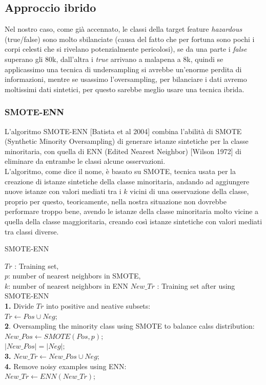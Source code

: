 \documentclass[italian,12pt,a4paper]{article}
\begin{document}
	\subsection{Approccio ibrido}
	Nel nostro caso, come già accennato, le classi della target feature \textit{hazardous} (true/false) sono molto sbilanciate (causa del fatto che per fortuna sono pochi i corpi celesti che si rivelano potenzialmente pericolosi), se da una parte i \textit{false} superano gli 80k, dall'altra i \textit{true} arrivano a malapena a 8k, quindi se applicassimo una tecnica di undersampling si avrebbe un’enorme perdita di informazioni, mentre se usassimo l’oversampling, per bilanciare i dati avremo moltissimi dati sintetici, per questo sarebbe meglio usare una tecnica ibrida.
	\linebreak
	\subsubsection{SMOTE-ENN}
	L’algoritmo SMOTE-ENN [Batista et al 2004] combina l’abilità di SMOTE (Synthetic Minority Oversampling)  di generare istanze sintetiche per la classe minoritaria, con quella di ENN (Edited Nearest Neighbor) [Wilson 1972] di eliminare da entrambe le classi alcune osservazioni. \\
	\linebreak
	L'algoritmo, come dice il nome, è basato su SMOTE, tecnica usata per la creazione di istanze sintetiche della classe minoritaria, andando ad aggiungere nuove istanze con valori mediati tra i $k$ vicini di una osservazione della classe, proprio per questo, teoricamente, nella nostra situazione non dovrebbe performare troppo bene, avendo le istanze della classe minoritaria molto vicine a quella della classe maggioritaria, creando così istanze sintetiche con valori mediati tra classi diverse.
	
	\begin{algorithm}
		\caption{SMOTE-ENN}
		\begin{algorithmic}
			\Require $Tr$ : Training set, \\ $p$: number of nearest neighbors in SMOTE, \\ $k$: number of nearest neighbors in ENN
			\Ensure $New\_Tr$ : Training set after using SMOTE-ENN \\
			\textbf{1.} Divide $Tr$ into positive and neative subsets: \\ $Tr \leftarrow Pos \cup Neg;$  \\
			\textbf{2}. Oversampling the minority class using SMOTE to balance calss distribution: \\
			$New\_Pos \leftarrow SMOTE(Pos, p);$ \\
			$|New\_Pos| = |Neg|;$ \\
			\textbf{3.} $New\_Tr \leftarrow New\_Pos \cup Neg;$ \\
			\textbf{4.} Remove noisy examples using ENN: \\
			$New\_Tr \leftarrow ENN(New\_Tr);$
		\end{algorithmic}
	\end{algorithm}
\end{document}
